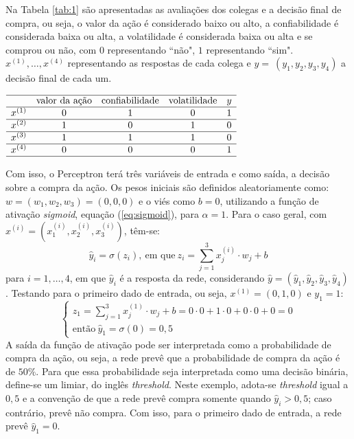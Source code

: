 Na Tabela \ref{tab:1} são apresentadas as avaliações dos colegas e a decisão final de compra, ou seja, o valor da ação é considerado baixo ou alto, a confiabilidade é considerada baixa ou alta, a volatilidade é considerada baixa ou alta e se comprou ou não, com $0$ representando ``não", $1$ representando ``sim". $x^{(1)}, \hdots, x^{(4)}$ representando as respostas de cada colega e $y =~(y_1, y_2, y_3, y_4)$ a decisão final de cada um.
\begin{table}[H]
    \centering
    \caption{Banco de dados com as avaliações dos colegas e a decisão final de compra.}
    \label{tab:1}
    $\begin{array}{ccccc}
    \hline
    & \text{valor da ação} & \text{confiabilidade} & \text{volatilidade} & y \\
    \hline
    x^{(1)} & 0 & 1 & 0 & 1 \\
    \hline
    x^{(2)} & 1 & 0 & 1 & 0 \\
    \hline
    x^{(3)} & 1 & 1 & 1 & 0 \\
    \hline
    x^{(4)} & 0 & 0 & 0 & 1 \\
    \hline

\end{array}$
\end{table}
Com isso, o Perceptron terá três variáveis de entrada e como saída, a decisão sobre a compra da ação. Os pesos iniciais são definidos aleatoriamente como: $w =(w_1, w_2, w_3) = (0, 0, 0)$ e o viés como $b = 0$, utilizando a função de ativação \textit{sigmoid}, equação (\ref{eq:sigmoid}), para $\alpha = 1$. Para o caso geral, com $x^{(i)} = (x^{(i)}_1, x^{(i)}_2, x^{(i)}_3 )$, têm-se:
$$
\hat{y}_i = \sigma(z_i), \ \text{em que} \ z_i =  \sum_{j=1}^{3}x^{(i)}_j\cdot w_j + b
$$
para $i = 1, \hdots, 4$, em que $\hat{y}_i$ é a resposta da rede, considerando $\hat{y} = (\hat{y}_1, \hat{y}_2, \hat{y}_3, \hat{y}_4)$.
Testando para o primeiro dado de entrada, ou seja, $x^{(1)} = (0,1,0)$ e $y_1 = 1$:
$$
\begin{cases}
    z_1 = \sum_{j=1}^{3}x^{(1)}_j\cdot w_j + b = 0\cdot0 + 1\cdot0 + 0\cdot0 + 0 = 0 \\ 
    \text{então} \ \hat{y}_1 = \sigma(0) = 0,5
    
\end{cases}
$$
A saída da função de ativação pode ser interpretada como a probabilidade de compra da ação, ou seja, a rede prevê que a probabilidade de compra da ação é de $50\%$. Para que essa probabilidade seja interpretada como uma decisão binária, define-se um limiar, do inglês \textit{threshold}. Neste exemplo, adota-se \textit{threshold} igual a $0,5$ e a convenção de que a rede prevê compra somente quando $\hat{y}_i > 0,5$; caso contrário, prevê não compra. Com isso, para o primeiro dado de entrada, a rede prevê $\hat{y}_1 = 0$.

